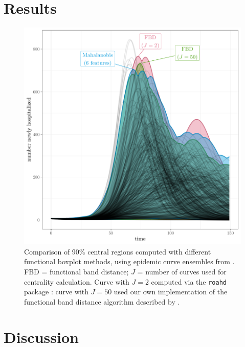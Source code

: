 \documentclass[fleqn,10pt,lineno]{wlpeerj}
\begin{document}
\section*{Results}

\begin{figure}[ht]\centering
  \includegraphics[width=\linewidth]{scripts/cent_plot.pdf}
  \caption{Comparison of 90\% central regions computed with
    different functional boxplot methods, using epidemic curve ensembles from \juul. FBD = functional band distance; $J$ = number of curves used for centrality calculation. Curve with $J=2$ computed via the \texttt{roahd} package \citep{roahd}: curve with $J=50$ used our own implementation of the functional band distance algorithm described by \juul.
  }
  \label{p.a}
\end{figure}
 
\section*{Discussion}

\end{document}
